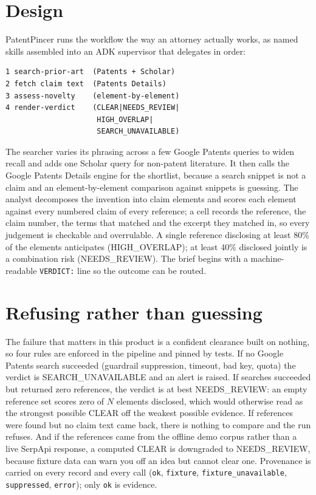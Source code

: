 \documentclass[12pt]{article}
\begin{document}
\section{Design}
PatentPincer runs the workflow the way an attorney actually works, as named
skills assembled into an ADK supervisor that delegates in order:
\begin{lstlisting}
1 search-prior-art  (Patents + Scholar)
2 fetch claim text  (Patents Details)
3 assess-novelty    (element-by-element)
4 render-verdict    (CLEAR|NEEDS_REVIEW|
                     HIGH_OVERLAP|
                     SEARCH_UNAVAILABLE)
\end{lstlisting}
The searcher varies its phrasing across a few Google Patents queries to widen
recall and adds one Scholar query for non-patent literature. It then calls the
Google Patents Details engine for the shortlist, because a search snippet is not
a claim and an element-by-element comparison against snippets is guessing. The
analyst decomposes the invention into claim elements and scores each element
against every numbered claim of every reference; a cell records the reference,
the claim number, the terms that matched and the excerpt they matched in, so
every judgement is checkable and overrulable. A single reference disclosing at
least 80\% of the elements anticipates (HIGH\_OVERLAP); at least 40\% disclosed
jointly is a combination risk (NEEDS\_REVIEW). The brief begins with a
machine-readable \texttt{VERDICT:} line so the outcome can be routed.

\section{Refusing rather than guessing}
The failure that matters in this product is a confident clearance built on
nothing, so four rules are enforced in the pipeline and pinned by tests. If no
Google Patents search succeeded (guardrail suppression, timeout, bad key, quota)
the verdict is SEARCH\_UNAVAILABLE and an alert is raised. If searches succeeded
but returned zero references, the verdict is at best NEEDS\_REVIEW: an empty
reference set scores zero of $N$ elements disclosed, which would otherwise read
as the strongest possible CLEAR off the weakest possible evidence. If references
were found but no claim text came back, there is nothing to compare and the run
refuses. And if the references came from the offline demo corpus rather than a
live SerpApi response, a computed CLEAR is downgraded to NEEDS\_REVIEW, because
fixture data can warn you off an idea but cannot clear one. Provenance is carried
on every record and every call (\texttt{ok}, \texttt{fixture},
\texttt{fixture\_unavailable}, \texttt{suppressed}, \texttt{error}); only
\texttt{ok} is evidence.
\end{document}
